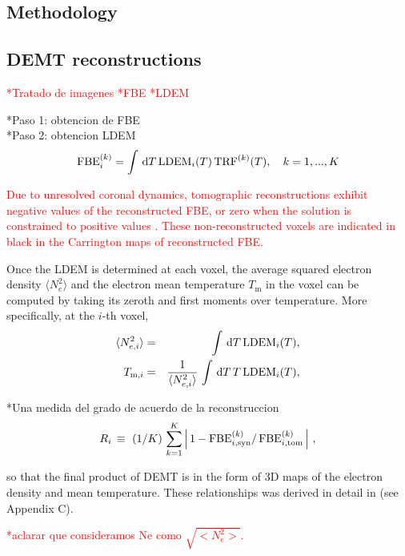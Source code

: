 \documentclass[namedreferences]{solarphysics}
\newcommand{\LDEM}{{\rm LDEM}}
\newcommand{\FBE}{{\rm FBE}}
\newcommand{\TRF}{{\rm TRF}}
\begin{document}
\begin{article}
\section{Methodology}\label{meto}   

\subsection{DEMT reconstructions}\label{demt} 
\textcolor{red}{*Tratado de imagenes}
\textcolor{red}{*FBE}
\textcolor{red}{*LDEM}


*Paso 1: obtencion de FBE\\
*Paso 2: obtencion LDEM
\begin{equation}\label{fbeldem}
\FBE_i^{(k)}  = \int\,\textrm{d}T\,\LDEM_i(T)\,{\TRF}^{(k)}(T), \ \ \ {k=1,...,K}
\end{equation}

\textcolor{red}{
Due to unresolved coronal dynamics, tomographic reconstructions exhibit negative values of the reconstructed FBE, or zero when the solution is constrained to positive values \citep{frazin_2000,frazin_2009}. {These non-reconstructed voxels are indicated in black in the Carrington maps of reconstructed FBE}.
}

Once the LDEM is determined at each voxel, the average squared electron density $\langle N_e^2 \rangle$ and the electron mean temperature $T_\textrm{m}$ in the voxel can be computed by taking its zeroth and first moments over temperature. More specifically, at the $i$-th voxel,
\begin{eqnarray}\label{momento1}
 \langle N_{e,i}^2 \rangle &=& \int\,\textrm{d}T\,\LDEM_i(T),\label{Ne} \\ 
\label{momento2}
 T_{\textrm{m},i}   &=& \frac{1}{\langle N_{e,i}^2 \rangle}\,\int\,\textrm{d}T\,T\,\LDEM_i(T),\label{Tm} 
\end{eqnarray}

*Una medida del grado de acuerdo de la reconstruccion
\begin{equation}\label{R}
R_i \, \equiv \ (1/K) \, \sum_{k=1}^K \left| \, 1 - \FBE^{(k)}_{i,\rm syn} / \,\FBE^{(k)}_{i,\rm tom}\, \right| \,,
\end{equation}

so that the final product of DEMT is in the form of 3D maps of the electron density and mean temperature. These relationships was derived in detail in \citealt{frazin_2009} (see Appendix C). 

\textcolor{red}{*aclarar que consideramos Ne como $\sqrt{<N_e ^2>}$.}


\end{article}
\end{document}
